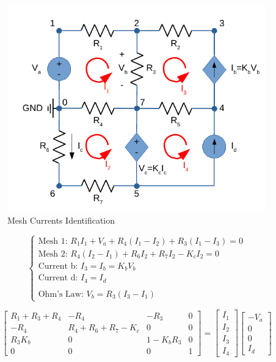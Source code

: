 \begin{figure}[h] \centering
  \includegraphics[width=0.7\linewidth]{MeshMethod.pdf}
  \caption{Mesh Currents Identification}
  \label{fig:MeshMethod}
\end{figure}

$$
\begin{cases}
  \text{Mesh 1: } R_{1}I_{1}+V_{a}+R_{4}(I_{1}-I_{2})+R_{3}(I_{1}-I_{3}) = 0\\
  \text{Mesh 2: } R_{4}(I_{2}-I_{1})+R_{6}I_{2}+R_{7}I_{2}-K_{c}I_{2} = 0\\
  \text{Current b: } I_{3} = I_{b} = K_{b}V_{b}\\
  \text{Current d: } I_{4} = I_{d}\\
  \\
  \text{Ohm's Law: } V_{b} = R_{3}(I_{3}-I_{1})
\end{cases}
$$

$$
\begin{bmatrix}
  R_{1}+R_{3}+R_{4} & -R_{4} & -R_{3} & 0 \\
  -R_{4} & R_{4}+R_{6}+R_{7}-K_{c} & 0 & 0\\
  R_{3}K_{b} & 0 & 1-K_{b}R_{3} & 0\\
  0 & 0 & 0 & 1
\end{bmatrix}
=
\begin{bmatrix}
  I_{1}\\
  I_{2}\\
  I_{3}\\
  I_{4}
\end{bmatrix}
\begin{bmatrix}
  -V_{a}\\
  0\\
  0\\
  I_{d}
\end{bmatrix}
$$

